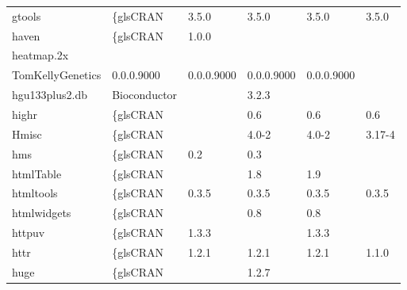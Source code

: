 \begin{longtable}{llllll}
\rowcolor{black!5}
gtools                        & \{gls{CRAN}                      & 3.5.0       & 3.5.0       & 3.5.0          & 3.5.0              \\
\rowcolor{black!10}
haven                         & \{gls{CRAN}                      & 1.0.0       &             &                &                   \\
\rowcolor{black!5}
heatmap.2x                    & \begin{tabular}[c]{@{}l@{}}GitHub \\ TomKellyGenetics \end{tabular}  & 0.0.0.9000  & 0.0.0.9000  & 0.0.0.9000     & 0.0.0.9000         \\
\rowcolor{black!10}
hgu133plus2.db                & Bioconductor              &             & 3.2.3       &                &                   \\
\rowcolor{black!5}
highr                         & \{gls{CRAN}                      &             & 0.6         & 0.6            & 0.6                \\
\rowcolor{black!10}
Hmisc                         & \{gls{CRAN}                      &             & 4.0-2       & 4.0-2          & 3.17-4            \\
\rowcolor{black!5}
hms                           & \{gls{CRAN}                      & 0.2         & 0.3         &                &                    \\
\rowcolor{black!10}
htmlTable                     & \{gls{CRAN}                      &             & 1.8         & 1.9            &                   \\
\rowcolor{black!5}
htmltools                     & \{gls{CRAN}                      & 0.3.5       & 0.3.5       & 0.3.5          & 0.3.5              \\
\rowcolor{black!10}
htmlwidgets                   & \{gls{CRAN}                      &             & 0.8         & 0.8            &                   \\
\rowcolor{black!5}
httpuv                        & \{gls{CRAN}                      & 1.3.3       &             & 1.3.3          &                    \\
\rowcolor{black!10}
httr                          & \{gls{CRAN}                      & 1.2.1       & 1.2.1       & 1.2.1          & 1.1.0             \\
\rowcolor{black!5}
huge                          & \{gls{CRAN}                      &             & 1.2.7       &                &                    \\

\end{longtable}
